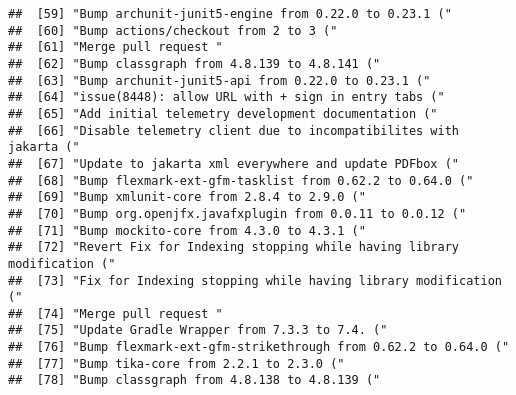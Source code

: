 \documentclass[
]{article}
\begin{document}
\begin{verbatim}
##  [59] "Bump archunit-junit5-engine from 0.22.0 to 0.23.1 ("                                                                        
##  [60] "Bump actions/checkout from 2 to 3 ("                                                                                        
##  [61] "Merge pull request "                                                                                                        
##  [62] "Bump classgraph from 4.8.139 to 4.8.141 ("                                                                                  
##  [63] "Bump archunit-junit5-api from 0.22.0 to 0.23.1 ("                                                                           
##  [64] "issue(8448): allow URL with + sign in entry tabs ("                                                                         
##  [65] "Add initial telemetry development documentation ("                                                                          
##  [66] "Disable telemetry client due to incompatibilites with jakarta ("                                                            
##  [67] "Update to jakarta xml everywhere and update PDFbox ("                                                                       
##  [68] "Bump flexmark-ext-gfm-tasklist from 0.62.2 to 0.64.0 ("                                                                     
##  [69] "Bump xmlunit-core from 2.8.4 to 2.9.0 ("                                                                                    
##  [70] "Bump org.openjfx.javafxplugin from 0.0.11 to 0.0.12 ("                                                                      
##  [71] "Bump mockito-core from 4.3.0 to 4.3.1 ("                                                                                    
##  [72] "Revert Fix for Indexing stopping while having library modification ("                                                       
##  [73] "Fix for Indexing stopping while having library modification ("                                                              
##  [74] "Merge pull request "                                                                                                        
##  [75] "Update Gradle Wrapper from 7.3.3 to 7.4. ("                                                                                 
##  [76] "Bump flexmark-ext-gfm-strikethrough from 0.62.2 to 0.64.0 ("                                                                
##  [77] "Bump tika-core from 2.2.1 to 2.3.0 ("                                                                                       
##  [78] "Bump classgraph from 4.8.138 to 4.8.139 ("                                                                                  

\end{verbatim}
\end{document}
